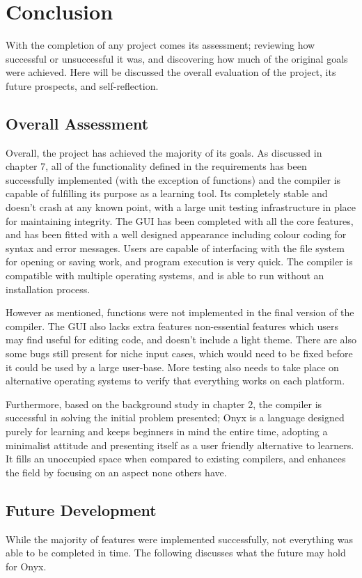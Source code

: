 \documentclass[
]{report}
\begin{document}
\chapter{Conclusion}
With the completion of any project comes its assessment; reviewing how
successful or unsuccessful it was, and discovering how much of the
original goals were achieved. Here will be discussed the overall
evaluation of the project, its future prospects, and self-reflection.

\section{Overall Assessment}
Overall, the project has achieved the majority of its goals. As
discussed in chapter 7, all of the functionality defined in the
requirements has been successfully implemented (with the exception of
functions) and the compiler is capable of fulfilling its purpose as a
learning tool. Its completely stable and doesn't crash at any known
point, with a large unit testing infrastructure in place for maintaining
integrity. The GUI has been completed with all the core features, and
has been fitted with a well designed appearance including colour coding
for syntax and error messages. Users are capable of interfacing with the
file system for opening or saving work, and program execution is very
quick. The compiler is compatible with multiple operating systems, and
is able to run without an installation process.

However as mentioned, functions were not implemented in the final
version of the compiler. The GUI also lacks extra features non-essential
features which users may find useful for editing code, and doesn't
include a light theme. There are also some bugs still present for niche
input cases, which would need to be fixed before it could be used by a
large user-base. More testing also needs to take place on alternative
operating systems to verify that everything works on each platform.

Furthermore, based on the background study in chapter 2, the compiler is
successful in solving the initial problem presented; Onyx is a language
designed purely for learning and keeps beginners in mind the entire
time, adopting a minimalist attitude and presenting itself as a user
friendly alternative to learners. It fills an unoccupied space when
compared to existing compilers, and enhances the field by focusing on an
aspect none others have.

\section{Future Development}
While the majority of features were implemented successfully, not
everything was able to be completed in time. The following discusses
what the future may hold for Onyx.
\end{document}
